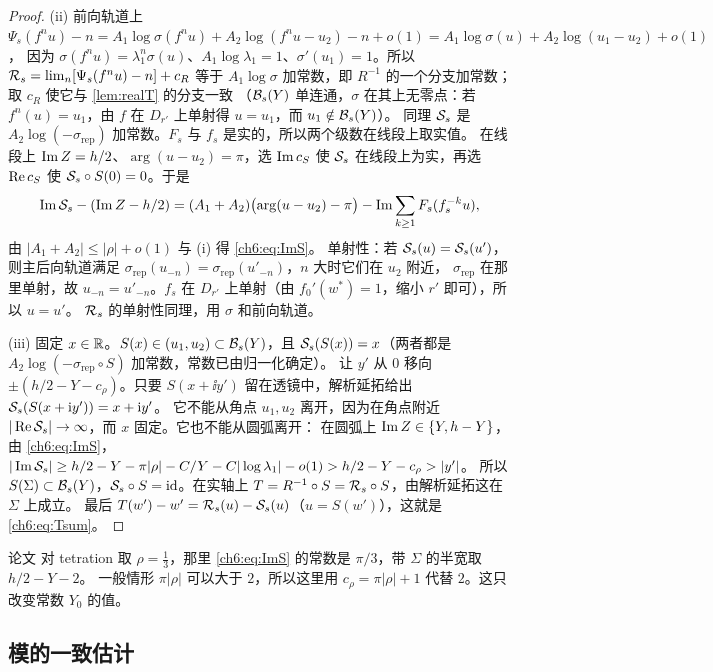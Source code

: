 \begin{proof}
(ii) 前向轨道上 $\Psi_s(f^nu)-n=A_1\log\sigma(f^nu)+A_2\log(f^nu-u_2)-n+o(1)=A_1\log\sigma(u)+A_2\log(u_1-u_2)+o(1)$，
因为 $\sigma(f^nu)=\lambda_1^n\sigma(u)$、$A_1\log\lambda_1=1$、$\sigma'(u_1)=1$。所以 $\mathcal R_s=\lim_n[\Psi_s(f^nu)-n]+c_R$
等于 $A_1\log\sigma$ 加常数，即 $R^{-1}$ 的一个分支加常数；取 $c_R$ 使它与 \cref{lem:realT} 的分支一致
（$\mathcal B_s(Y)$ 单连通，$\sigma$ 在其上无零点：若 $f^n(u)=u_1$，由 $f$ 在 $D_{r'}$ 上单射得 $u=u_1$，而 $u_1\notin\mathcal B_s(Y)$）。
同理 $\mathcal S_s$ 是 $A_2\log(-\sigma_{\mathrm{rep}})$ 加常数。$F_s$ 与 $f_s$ 是实的，所以两个级数在线段上取实值。
在线段上 $\operatorname{Im} Z=h/2$、$\arg(u-u_2)=\pi$，选 $\operatorname{Im} c_S$ 使 $\mathcal S_s$ 在线段上为实，再选 $\operatorname{Re} c_S$ 使 $\mathcal S_s\circ S(0)=0$。于是
\[
 \operatorname{Im}\mathcal S_s-(\operatorname{Im} Z-h/2)=(A_1+A_2)\bigl(\arg(u-u_2)-\pi\bigr)-\operatorname{Im}\sum_{k\ge1}F_s(f_s^{-k}u),
\]
由 $|A_1+A_2|\le|\rho|+o(1)$ 与 (i) 得 \eqref{ch6:eq:ImS}。
单射性：若 $\mathcal S_s(u)=\mathcal S_s(u')$，则主后向轨道满足 $\sigma_{\mathrm{rep}}(u_{-n})=\sigma_{\mathrm{rep}}(u'_{-n})$，$n$ 大时它们在 $u_2$ 附近，
$\sigma_{\mathrm{rep}}$ 在那里单射，故 $u_{-n}=u'_{-n}$。$f_s$ 在 $D_{r'}$ 上单射（由 $f_0'(w^*)=1$，缩小 $r'$ 即可），所以 $u=u'$。
$\mathcal R_s$ 的单射性同理，用 $\sigma$ 和前向轨道。

(iii) 固定 $x\in\mathbb{R}$。$S(x)\in(u_1,u_2)\subset\mathcal B_s(Y)$，且 $\mathcal S_s(S(x))=x$（两者都是 $A_2\log(-\sigma_{\mathrm{rep}}\circ S)$ 加常数，常数已由归一化确定）。
让 $y'$ 从 $0$ 移向 $\pm(h/2-Y-c_\rho)$。只要 $S(x+\ii y')$ 留在透镜中，解析延拓给出 $\mathcal S_s(S(x+\mathrm{i} y'))=x+\mathrm{i} y'$。
它不能从角点 $u_1,u_2$ 离开，因为在角点附近 $|\operatorname{Re}\mathcal S_s|\to\infty$，而 $x$ 固定。它也不能从圆弧离开：
在圆弧上 $\operatorname{Im} Z\in\{Y,h-Y\}$，由 \eqref{ch6:eq:ImS}，$|\operatorname{Im}\mathcal S_s|\ge h/2-Y-\pi|\rho|-C/Y-C|\log\lambda_1|-o(1)>h/2-Y-c_\rho>|y'|$。
所以 $S(\Sigma)\subset\mathcal B_s(Y)$，$\mathcal S_s\circ S=\mathrm{id}$。在实轴上 $T=R^{-1}\circ S=\mathcal R_s\circ S$，由解析延拓这在 $\Sigma$ 上成立。
最后 $T(w')-w'=\mathcal R_s(u)-\mathcal S_s(u)$（$u=S(w')$），这就是 \eqref{ch6:eq:Tsum}。
\end{proof}

\begin{remark}\label{ch6:rem:band-const}
论文 \cite{KneserPaper} 对 tetration 取 $\rho=\tfrac13$，那里 \eqref{ch6:eq:ImS} 的常数是 $\pi/3$，带 $\Sigma$ 的半宽取 $h/2-Y-2$。
一般情形 $\pi|\rho|$ 可以大于 $2$，所以这里用 $c_\rho=\pi|\rho|+1$ 代替 $2$。这只改变常数 $Y_0$ 的值。
\end{remark}

\subsection{模的一致估计}

